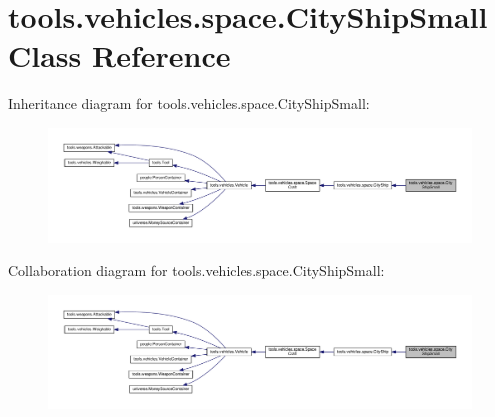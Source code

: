 \hypertarget{classtools_1_1vehicles_1_1space_1_1_city_ship_small}{}\section{tools.\+vehicles.\+space.\+City\+Ship\+Small Class Reference}
\label{classtools_1_1vehicles_1_1space_1_1_city_ship_small}


Inheritance diagram for tools.\+vehicles.\+space.\+City\+Ship\+Small\+:
\nopagebreak
\begin{figure}[H]
\begin{center}
\leavevmode
\includegraphics[width=350pt]{classtools_1_1vehicles_1_1space_1_1_city_ship_small__inherit__graph}
\end{center}
\end{figure}


Collaboration diagram for tools.\+vehicles.\+space.\+City\+Ship\+Small\+:
\nopagebreak
\begin{figure}[H]
\begin{center}
\leavevmode
\includegraphics[width=350pt]{classtools_1_1vehicles_1_1space_1_1_city_ship_small__coll__graph}
\end{center}
\end{figure}
